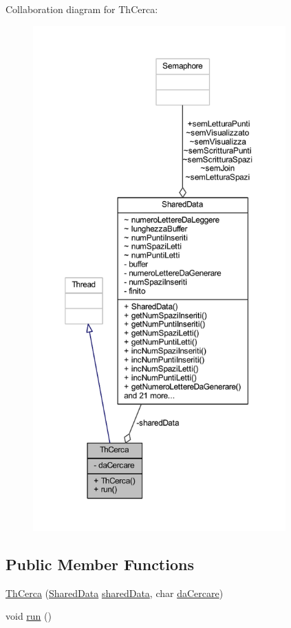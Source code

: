 Collaboration diagram for Th\+Cerca\+:
\nopagebreak
\begin{figure}[H]
\begin{center}
\leavevmode
\includegraphics[height=550pt]{classmain_1_1_th_cerca__coll__graph}
\end{center}
\end{figure}
\subsection*{Public Member Functions}
\begin{DoxyCompactItemize}
\item 
\mbox{\hyperlink{classmain_1_1_th_cerca_ae5572ee8b473eb1a52dfcc4c4363d731}{Th\+Cerca}} (\mbox{\hyperlink{classmain_1_1_shared_data}{Shared\+Data}} \mbox{\hyperlink{classmain_1_1_th_cerca_ac5f1128ef8d0ba91a8214e03732e2662}{shared\+Data}}, char \mbox{\hyperlink{classmain_1_1_th_cerca_a05008a7b42b41e8cb77230f70da26619}{da\+Cercare}})
\item 
void \mbox{\hyperlink{classmain_1_1_th_cerca_a13a43e6d814de94978c515cb084873b1}{run}} ()
\end{DoxyCompactItemize}
